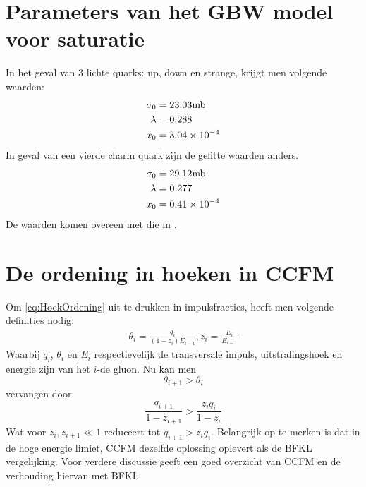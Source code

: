 \documentclass[a4paper,11pt]{article}
\numberwithin{equation}{section} %
\begin{document}
\section{Parameters van het GBW model voor saturatie} \label{app:GBWparameters}
In het geval van 3 lichte quarks: up, down en strange, krijgt men volgende waarden:
\begin{align}
\sigma_0 &= 23.03 \text{mb} \notag \\
\lambda &= 0.288 \\
x_0 &= 3.04 \times 10^{-4} \notag
\end{align}
In geval van een vierde charm quark zijn de gefitte waarden anders.
\begin{align}
\sigma_0 &= 29.12 \text{mb} \notag \\
\lambda &= 0.277 \\
x_0 &= 0.41 \times 10^{-4} \notag
\end{align}
De waarden komen overeen met die in \cite{GBW}.

\section{De ordening in hoeken in CCFM} \label{app:CCFM}
Om \eqref{eq:HoekOrdening} uit te drukken in impulsfracties, heeft men volgende definities nodig:
\begin{align}
\theta_i = \frac{q_i}{(1-z_i)E_{i-1}}, z_i = \frac{E_i}{E_{i-1}}
\end{align}
Waarbij $q_i$, $\theta_i$ en $E_i$ respectievelijk de transversale impuls, uitstralingshoek en energie zijn van het $i$-de gluon.
Nu kan men
\begin{equation}
\theta_{i+1} > \theta_i
\end{equation}
 vervangen door:
\begin{equation}
 \frac{q_{i+1}}{1-z_{i+1}} > \frac{z_i q_i}{1-z_i}
\end{equation}
Wat voor $z_i, z_{i+1} \ll 1$ reduceert tot $q_{i+1} > z_i q_i$.
Belangrijk op te merken is dat in de hoge energie limiet, CCFM dezelfde oplossing oplevert als de BFKL vergelijking.
Voor verdere discussie geeft \cite{Vera} een goed overzicht van CCFM en de verhouding hiervan met BFKL.
\end{document}
